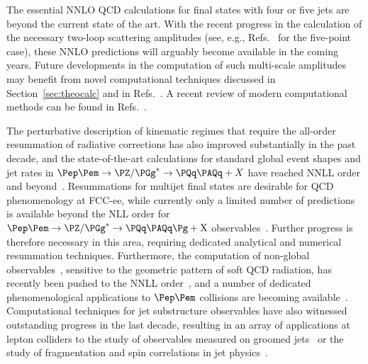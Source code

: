The essential NNLO QCD calculations for final states with four or five jets are beyond the current state of the art. With the recent progress in the calculation of the necessary two-loop scattering amplitudes (see, e.g., Refs.~\cite{Hartanto:2019uvl,Badger:2021nhg,Abreu:2021asb} for the five-point case), these NNLO predictions will arguably become available in the coming years.
Future developments in the computation of such multi-scale amplitudes may benefit from novel computational techniques 
discussed in Section~\ref{sec:theocalc} and in 
Refs.~\cite{Bierenbaum:2010cy,Badger:2013gxa,vonManteuffel:2014ixa,Ita:2015tya,Buchta:2015wna,Peraro:2016wsq,Liu:2017jxz,
Abreu:2017xsl,Capatti:2019ypt,Capatti:2020xjc,Liu:2021wks,Bobadilla:2021pvr}. 
A recent review of modern computational methods can be found in Refs.~\cite{Heinrich:2020ybq,EWPrecisionWshop}.

The perturbative description of kinematic regimes that require the all-order resummation of radiative corrections 
has also improved substantially in the past decade, 
and the state-of-the-art calculations for standard global event shapes and jet rates in
$\epem \to \PZ/\PGg^* \to \PQq\PAQq + X$ have reached NNLL order and
beyond~\cite{Becher:2008cf,Abbate:2010xh,Chien:2010kc,Monni:2011gb,
Becher:2012qc,Mateu:2013gya,Hoang:2014wka,deFlorian:2004mp,Banfi:2014sua,
Banfi:2016zlc,Tulipant:2017ybb,Moult:2018jzp,Banfi:2018mcq,Bell:2018gce,
Procura:2018zpn,Ebert:2020sfi,Bris:2020uyb,Moult:2022xzt,Duhr:2022yyp}. 
Resummations for multijet final states are desirable for QCD phenomenology at FCC-ee, 
while currently only a limited number of predictions is available beyond the NLL order for
$\epem \to \PZ/\PGg^* \to \PQq\PAQq \Pg + {\rm X}$ 
observables~\cite{Catani:1991hj,Larkoski:2018cke,Chen:2019bpb,Arpino:2019ozn}.
Further progress is therefore necessary in this area, 
requiring dedicated analytical and numerical resummation techniques.
%
Furthermore, the computation of non-global observables~\cite{Dasgupta:2001sh,Banfi:2002hw}, 
sensitive to the geometric pattern of soft QCD radiation, 
has recently been pushed to the NNLL order~\cite{Banfi:2021owj,Banfi:2021xzn,FerrarioRavasio:2023kyg,Becher:2023vrh}, 
and a number of dedicated phenomenological applications to $\epem$ collisions are becoming 
available~\cite{Dasgupta:2002bw,Banfi:2002hw,Weigert:2003mm,Hatta:2013iba,Becher:2015hka,
Larkoski:2015zka,Becher:2016mmh,Balsiger:2019tne,Banfi:2021xzn,Becher:2023vrh}.
Computational techniques for jet substructure observables have also witnessed outstanding progress in the last decade, 
resulting in an array of applications at lepton colliders to the study of observables measured 
on groomed jets~\cite{Frye:2016okc,Baron:2018nfz,Kardos:2020gty,Dasgupta:2022fim}
or the study of fragmentation and spin correlations 
in jet physics~\cite{Jain:2011xz,Chen:2020adz,Neill:2020bwv,Karlberg:2021kwr,Chen:2022muj,Chen:2023zlx,vanBeekveld:2023lsa}.

